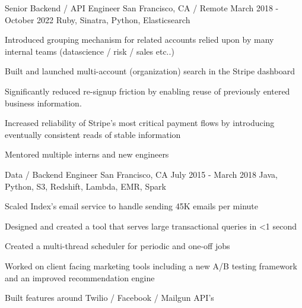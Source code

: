 \documentclass[letterpaper]{simjega-resume}
\begin{document}
{Senior Backend / API Engineer}
{San Francisco, CA / Remote}
{March 2018 - October 2022}
{Ruby, Sinatra, Python, Elasticsearch}
{\begin{tightitemize}
\item[] Introduced grouping mechanism for related accounts relied upon by many internal teams (datascience / risk / sales etc..)
\item[] Built and launched multi-account (organization) search in the Stripe dashboard
\item[] Significantly reduced re-signup friction by enabling reuse of previously entered business information.
\item[] Increased reliability of Stripe's most critical payment flows by introducing eventually consistent reads of stable information
\item[] Mentored multiple interns and new engineers
\end{tightitemize}}

{Data / Backend Engineer}
{San Francisco, CA}
{July 2015 - March 2018}
{Java, Python, S3, Redshift, Lambda, EMR, Spark}
{\begin{tightitemize}
\item[] Scaled Index's email service to handle sending 45K emails per minute
\item[] Designed and created a tool that serves large transactional queries in <1 second
\item[] Created a multi-thread scheduler for periodic and one-off jobs
\item[] Worked on client facing marketing tools including a new A/B testing framework and an improved recommendation engine
\item[] Built features around Twilio / Facebook / Mailgun API's
\end{tightitemize}}
\end{document}
